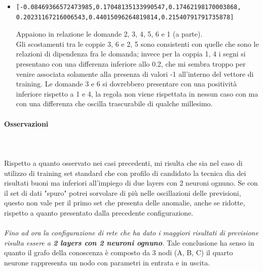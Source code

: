 \begin{itemize}
\item \begin{verbatim}[-0.08469366572473985,0.17048135133990547,0.17462198170003868,
0.20231167216006543,0.44015096264819814,0.21540791791735878]
\end{verbatim}
Appaiono in relazione le domande 2, 3, 4, 5, 6 e 1 (a parte).\\
Gli scostamenti tra le coppie 3, 6 e 2, 5 sono consistenti con quelle che sono le relazioni di dipendenza fra le domanda; invece per la coppia 1, 4 i segni si presentano con una differenza inferiore allo 0.2, che mi sembra troppo per venire associata solamente alla presenza di valori -1 all'interno del vettore di training.
Le domande 3 e 6 si dovrebbero presentare con una positivit\`a inferiore rispetto a 1 e 4, la regola non viene rispettata in nessun caso con ma con una differenza che oscilla trascurabile di qualche millesimo.
\end{itemize}

\paragraph{Osservazioni}\mbox{}
\label{Osservazioni su rete a 4 neuroni per 1 layer}
\\\\
\noindent
Rispetto a quanto osservato nei casi precedenti, mi risulta che sia nel caso di utilizzo di training set standard che con profilo di candidato la tecnica dia dei risultati buoni ma inferiori all'impiego di due layers con 2 neuroni ognuno. Se con il set di dati "spuro" potrei sorvolare di pi\`u nelle oscillazioni delle previsioni, questo non vale per il primo set che presenta delle anomalie, anche se ridotte, rispetto a quanto presentato dalla precedente configurazione.
\\\\
\noindent
\textit{Fino ad ora la configurazione di rete che ha dato i maggiori risultati di previsione risulta essere a \textbf{2 layers con 2 neuroni ognuno}.}
Tale conclusione ha senso in quanto il grafo della conoscenza \`e composto da 3 nodi (A, B, C) il quarto neurone rappresenta un nodo con parametri in entrata e in uscita.



